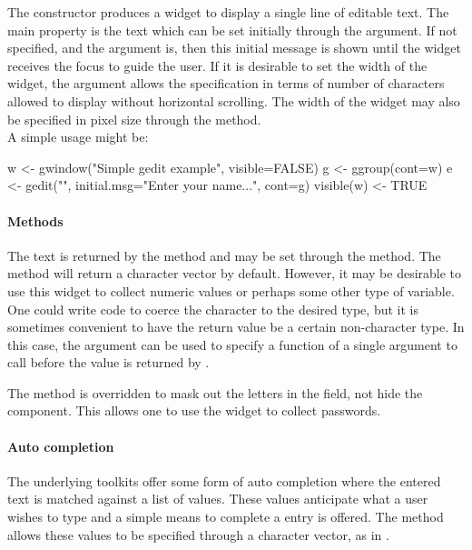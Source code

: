 The  constructor produces a widget to display a
single line of editable text. The main property is the text which can
be set initially through the  argument.  If 
not specified, and the argument  is,
then this initial message is shown until the widget receives the focus
to guide the user.  If it is desirable to set the width of the widget,
the  argument allows the specification in terms
of number of characters allowed to display without horizontal
scrolling. The width of the widget may also be specified in pixel size
through the  method.
\\

A simple usage might be:
\begin{Schunk}
\begin{Sinput}
 w <- gwindow("Simple gedit example", visible=FALSE)
 g <- ggroup(cont=w)
 e <- gedit("", initial.msg="Enter your name...", cont=g)
 visible(w) <- TRUE
\end{Sinput}
\end{Schunk}



\paragraph{Methods}
The text is returned by the  method and may be
set through the  method.  The
 method will return a character vector by
default. However, it may be desirable to use this widget to collect
numeric values or perhaps some other type of variable. One could write
code to coerce the character to the desired type, but it is sometimes
convenient to have the return value be a certain non-character
type. In this case, the  argument can be
used to specify a function of a single argument to call before the
value is returned by .

The  method is overridden to mask out the
letters in the field, not hide the component. This allows one to use
the widget to collect passwords.

\paragraph{Auto completion}
The underlying toolkits offer some form of auto completion where the
entered text is matched against a list of values. These values
anticipate what a user wishes to type and a simple means to complete a
entry is offered. The \method{[\ASSIGN}{gedit} method allows these
values to be specified through a character vector, as in .

